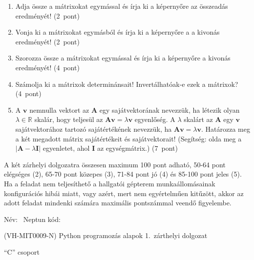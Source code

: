 \documentclass[a4paper,12pt]{letter}
\begin{document}
\begin{enumerate}
\begin{enumerate}
   \item Adja össze a mátrixokat egymással és írja ki a képernyőre az összeadás eredményét! \hfill (2~pont)
   \item Vonja ki a mátrixokat egymásból és írja ki a képernyőre a a kivonás eredményét! \hfill (2~pont)
   \item Szorozza össze a mátrixokat egymással és írja ki a képernyőre a kivonás eredményét! \hfill (4~pont)    \item Számolja ki a mátrixok determinánsait! Invertálhatóak-e ezek a mátrixok? \hfill (4~pont)
   \item A $\mathbf{v}$ nemnulla vektort az $\mathbf{A}$ egy sajátvektorának nevezzük, ha létezik olyan $\lambda \in \mathbb{R}$ skalár, hogy teljesül az $\mathbf{A}\mathbf{v}=\lambda \mathbf{v}$ egyenlőség. A $\lambda$ skalárt az $\mathbf{A}$ egy $\mathbf{v}$ sajátvektorához tartozó sajátértékének nevezzük, ha $\mathbf{A}\mathbf{v}=\lambda \mathbf{v}$. Határozza meg a két megadott mátrix sajátértékeit és sajátvektorait! (Segítség: olda meg a $\left|\mathbf{A}-\lambda\mathbf{I}\right|$ egyenletet, ahol $\mathbf{I}$ az egységmátrix.) \hfill (7~pont)
   \end{enumerate}
 \end{enumerate}

A két zárhelyi dolgozatra összesen maximum 100 pont adható, 50-64 pont elégséges (2), 65-70 pont közepes (3), 71-84 pont jó (4) és 85-100 pont jeles (5). Ha a feladat nem teljesíthető a hallgatói gépterem munkaállomásainak konfigurációs hibái miatt, vagy azért, mert nem egyértelműen kitűzött, akkor az adott feladat mindenki számára maximális pontszámmal veendő figyelembe.

\bigskip


\vfill

\newpage

Név: \hrulefill\ Neptun kód: \hrulefill

\begin{center}
 (VH-MIT0009-N) Python programozás alapok 1.~zárthelyi dolgozat

 ``C'' csoport
 \end{center}
\end{document}
